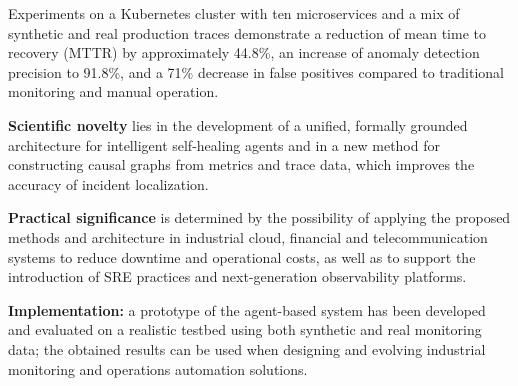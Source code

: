 Experiments on a Kubernetes cluster with ten microservices and a mix of synthetic and real production traces demonstrate a reduction of mean time to recovery (MTTR) by approximately 44.8\%, an increase of anomaly detection precision to 91.8\%, and a 71\% decrease in false positives compared to traditional monitoring and manual operation.

\textbf{Scientific novelty} lies in the development of a unified, formally grounded architecture for intelligent self-healing agents and in a new method for constructing causal graphs from metrics and trace data, which improves the accuracy of incident localization.

\textbf{Practical significance} is determined by the possibility of applying the proposed methods and architecture in industrial cloud, financial and telecommunication systems to reduce downtime and operational costs, as well as to support the introduction of SRE practices and next-generation observability platforms.

\textbf{Implementation:} a prototype of the agent-based system has been developed and evaluated on a realistic testbed using both synthetic and real monitoring data; the obtained results can be used when designing and evolving industrial monitoring and operations automation solutions.

\newpage
